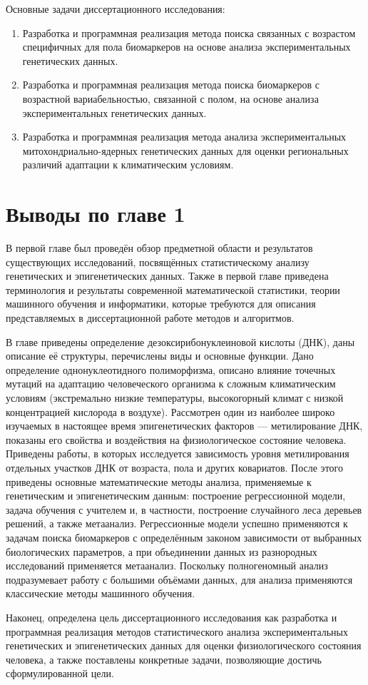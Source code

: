Основные задачи диссертационного исследования:
\begin{enumerate}
	\item Разработка и программная реализация метода поиска связанных с возрастом специфичных для пола биомаркеров на основе анализа экспериментальных генетических данных.
	\item Разработка и программная реализация метода поиска биомаркеров с возрастной вариабельностью, связанной с полом, на основе анализа экспериментальных генетических данных. 
	\item Разработка и программная реализация метода анализа экспериментальных митохондриально-ядерных генетических данных для оценки региональных различий адаптации к климатическим условиям. 
\end{enumerate}

\section*{Выводы по главе 1} \label{sec:ch1/conclusion}                       

В первой главе был проведён обзор предметной области и результатов существующих исследований, посвящённых статистическому анализу генетических и эпигенетических данных. Также в первой главе приведена терминология и результаты современной математической статистики, теории машинного обучения и информатики, которые требуются для описания представляемых в диссертационной работе методов и алгоритмов.

В главе приведены определение дезоксирибонуклеиновой кислоты (ДНК), даны описание её структуры, перечислены виды и основные функции. Дано определение однонуклеотидного полиморфизма, описано влияние точечных мутаций на адаптацию человеческого организма к сложным климатическим условиям (экстремально низкие температуры, высокогорный климат с низкой концентрацией кислорода в воздухе). Рассмотрен один из наиболее широко изучаемых в настоящее время эпигенетических факторов --- метилирование ДНК, показаны его свойства и воздействия на физиологическое состояние человека. Приведены работы, в которых исследуется зависимость уровня метилирования отдельных участков ДНК от возраста, пола и других ковариатов. После этого приведены основные математические методы анализа, применяемые к генетическим и эпигенетическим данным: построение регрессионной модели, задача обучения с учителем и, в частности, построение случайного леса деревьев решений, а также метаанализ. Регрессионные модели успешно применяются к задачам поиска биомаркеров с определённым законом зависимости от выбранных биологических параметров, а при объединении данных из разнородных исследований применяется метаанализ. Поскольку полногеномный анализ подразумевает работу с большими объёмами данных, для анализа применяются классические методы машинного обучения.

Наконец, определена цель диссертационного исследования как разработка и программная реализация методов статистического анализа экспериментальных генетических и эпигенетических данных для оценки физиологического состояния человека, а также поставлены конкретные задачи, позволяющие достичь сформулированной цели.


\FloatBarrier
